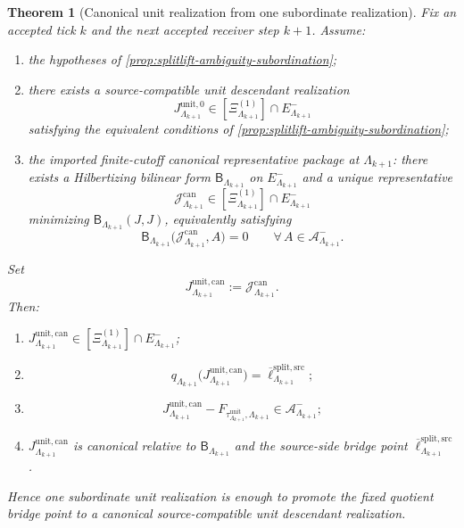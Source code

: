 \documentclass[11pt]{article}
\theoremstyle{definition}
\theoremstyle{plain}
\newtheorem{theorem}[definition]{Theorem}
\theoremstyle{remark}
\newcommand{\1}{\mathbf 1}
\begin{document}
\begin{theorem}[Canonical unit realization from one subordinate realization]
\label{thm:splitlift-canonical-unit-realization}
Fix an accepted tick \(k\) and the next accepted receiver step \(k+1\).
Assume:
\begin{enumerate}[leftmargin=2em]
\item the hypotheses of \cref{prop:splitlift-ambiguity-subordination};
\item there exists a source-compatible unit descendant realization
  \[
  J^{\mathrm{unit},0}_{\Lambda_{k+1}}
  \in
  [\Xi^{(1)}_{\Lambda_{k+1}}]\cap E^-_{\Lambda_{k+1}}
  \]
  satisfying the equivalent conditions of \cref{prop:splitlift-ambiguity-subordination};
\item the imported finite-cutoff canonical representative package at \(\Lambda_{k+1}\): there exists
  a Hilbertizing bilinear form
  \(
  \mathsf B_{\Lambda_{k+1}}
  \)
  on
  \(
  E^-_{\Lambda_{k+1}}
  \)
  and a unique representative
  \[
  \mathcal J^{\mathrm{can}}_{\Lambda_{k+1}}
  \in
  [\Xi^{(1)}_{\Lambda_{k+1}}]\cap E^-_{\Lambda_{k+1}}
  \]
  minimizing
  \(
  \mathsf B_{\Lambda_{k+1}}(J,J)
  \),
  equivalently satisfying
  \[
  \mathsf B_{\Lambda_{k+1}}
  \bigl(
  \mathcal J^{\mathrm{can}}_{\Lambda_{k+1}},
  A
  \bigr)
  =
  0
  \qquad
  \forall\,A\in\mathcal A^-_{\Lambda_{k+1}}.
  \]
\end{enumerate}
Set
\[
J^{\mathrm{unit,can}}_{\Lambda_{k+1}}
:=
\mathcal J^{\mathrm{can}}_{\Lambda_{k+1}}.
\]
Then:
\begin{enumerate}[leftmargin=2em]
\item
  \(
  J^{\mathrm{unit,can}}_{\Lambda_{k+1}}
  \in
  [\Xi^{(1)}_{\Lambda_{k+1}}]\cap E^-_{\Lambda_{k+1}}
  \);
\item
  \[
  q_{\Lambda_{k+1}}
  \!\bigl(
  J^{\mathrm{unit,can}}_{\Lambda_{k+1}}
  \bigr)
  =
  \overline\ell^{\mathrm{split,src}}_{\Lambda_{k+1}};
  \]
\item
  \[
  J^{\mathrm{unit,can}}_{\Lambda_{k+1}}
  -
  F_{\tau^{\mathrm{unit}}_{\Lambda_{k+1}},\Lambda_{k+1}}
  \in
  \mathcal A^-_{\Lambda_{k+1}};
  \]
\item
  \(
  J^{\mathrm{unit,can}}_{\Lambda_{k+1}}
  \)
  is canonical relative to
  \(
  \mathsf B_{\Lambda_{k+1}}
  \)
  and the source-side bridge point
  \(
  \overline\ell^{\mathrm{split,src}}_{\Lambda_{k+1}}
  \).
\end{enumerate}
Hence one subordinate unit realization is enough to promote the fixed quotient bridge point to a
canonical source-compatible unit descendant realization.
\end{theorem}
\end{document}
